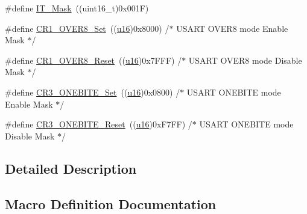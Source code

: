 \begin{DoxyCompactItemize}
\item 
\#define \hyperlink{group___u_s_a_r_t___private___defines_ga401c753d4de6ab56fcb026c91b8c8487}{I\+T\+\_\+\+Mask}~((uint16\+\_\+t)0x001\+F)
\item 
\#define \hyperlink{group___u_s_a_r_t___private___defines_ga11495857ca81074790c376317382140f}{C\+R1\+\_\+\+O\+V\+E\+R8\+\_\+\+Set}~((\hyperlink{group___exported__types_gace9d960e74685e2cd84b36132dbbf8aa}{u16})0x8000)  /$\ast$ U\+S\+A\+R\+T O\+V\+E\+R8 mode Enable Mask $\ast$/
\item 
\#define \hyperlink{group___u_s_a_r_t___private___defines_gaf84165f2974000906c495b3c27dc5121}{C\+R1\+\_\+\+O\+V\+E\+R8\+\_\+\+Reset}~((\hyperlink{group___exported__types_gace9d960e74685e2cd84b36132dbbf8aa}{u16})0x7\+F\+F\+F)  /$\ast$ U\+S\+A\+R\+T O\+V\+E\+R8 mode Disable Mask $\ast$/
\item 
\#define \hyperlink{group___u_s_a_r_t___private___defines_gac512024dda541435acfe0b50de925105}{C\+R3\+\_\+\+O\+N\+E\+B\+I\+T\+E\+\_\+\+Set}~((\hyperlink{group___exported__types_gace9d960e74685e2cd84b36132dbbf8aa}{u16})0x0800)  /$\ast$ U\+S\+A\+R\+T O\+N\+E\+B\+I\+T\+E mode Enable Mask $\ast$/
\item 
\#define \hyperlink{group___u_s_a_r_t___private___defines_ga55dc289819dde550630df98267bbef52}{C\+R3\+\_\+\+O\+N\+E\+B\+I\+T\+E\+\_\+\+Reset}~((\hyperlink{group___exported__types_gace9d960e74685e2cd84b36132dbbf8aa}{u16})0x\+F7\+F\+F)  /$\ast$ U\+S\+A\+R\+T O\+N\+E\+B\+I\+T\+E mode Disable Mask $\ast$/
\end{DoxyCompactItemize}


\subsection{Detailed Description}


\subsection{Macro Definition Documentation}
\mbox{\label{group___u_s_a_r_t___private___defines_ga67f7dd35ea3d1296677e5fc50b88fa90}} 
